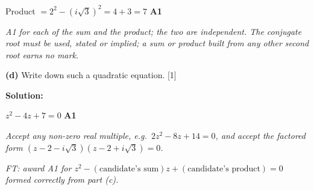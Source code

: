 \documentclass[12pt, twoside]{article}
\begin{document}
\begin{enumerate}[itemsep=0.3cm]
Product $= 2^2 - (i\sqrt{3})^2 = 4 + 3 = 7$ \hfill \textbf{A1}

\emph{A1 for each of the sum and the product; the two are independent. The
conjugate root must be used, stated or implied; a sum or product built from
any other second root earns no mark.}

\medskip

\textbf{(d)} Write down such a quadratic equation. \hfill [1]

\textbf{Solution:}

$z^2 - 4z + 7 = 0$ \hfill \textbf{A1}

\emph{Accept any non-zero real multiple, e.g.\ $2z^2 - 8z + 14 = 0$, and
accept the factored form $(z - 2 - i\sqrt{3})(z - 2 + i\sqrt{3}) = 0$.}

\emph{FT: award A1 for $z^2 - (\text{candidate's sum})z +
(\text{candidate's product}) = 0$ formed correctly from part (c).}

\end{enumerate}
\end{document}
